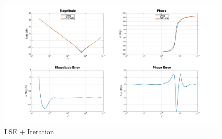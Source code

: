 \begin{figure}[ht!]
\includegraphics[keepaspectratio=true,width=6in]{./figures/regression/levyIter.jpg}
\centering
\caption{LSE + Iteration}
\label{fig:levyIter}
\end{figure}

